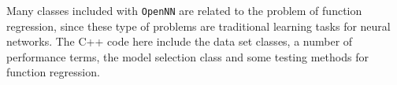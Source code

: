Many classes included with \texttt{OpenNN} are related to the problem of function regression, since these type of problems are traditional learning tasks for neural networks. The C++ code here include the
data set classes, a number of performance terms, the model selection class and some testing methods for function regression. 

